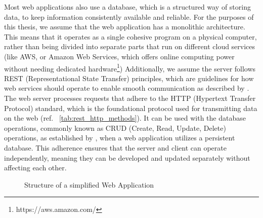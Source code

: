 Most web applications also use a database, which is a structured way of storing data, to keep information consistently available and reliable. For the purposes of this thesis, we assume that the web application has a monolithic architecture. This means that it operates as a single cohesive program on a physical computer, rather than being divided into separate parts that run on different cloud services (like AWS, or Amazon Web Services, which offers online computing power without needing dedicated hardware\footnote{https://aws.amazon.com/})
Additionally, we assume the server follows REST (Representational State Transfer) principles, which are guidelines for how web services should operate to enable smooth communication as described by \citet{roy_t_fielding_rest_2008}. 
The web server processes requests that adhere to the HTTP (Hypertext Transfer Protocol) standard, which is the foundational protocol used for transmitting data on the web (ref. ~\autoref{tab:rest_http_methods}). It can be used  with the database operations, commonly known as CRUD (Create, Read, Update, Delete) operations, as established by \citet{martin_managing_1983}, when a web application utilizes a persistent database.
This adherence ensures that the server and client can operate independently, meaning they can be developed and updated separately without affecting each other\cite{fielding_http_2022}.


\begin{figure}[ht]
    \centering
    \caption{Structure of a simplified Web Application}
    \label{fig:simplified-web-app}

\end{figure}

